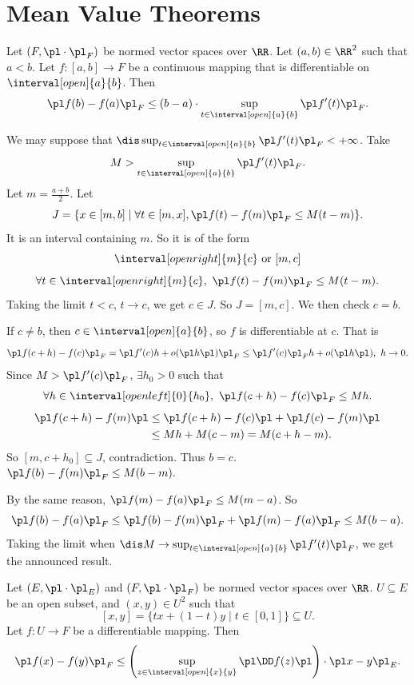 \section{Mean Value Theorems}
\begin{theoremenv}
    Let $(F,\pl\cdot\pl_F)$ be normed vector spaces over $\RR$. Let $(a,b)\in \RR^2$ such that $a<b$. Let $f:[a,b]\longrightarrow F$ be a continuous mapping that is differentiable on $\interval[open]{a}{b}$. Then 
    $$\pl f(b)-f(a)\pl_F\le  (b-a)\cdot \sup_{t\in \interval[open]{a}{b}}\pl f'(t)\pl_F.$$
    
\end{theoremenv}
\begin{proofenv}
    We may suppose that $\dis \sup_{t\in \interval[open]{a}{b}}\pl f'(t)\pl_F<+\infty$. Take
    $$M>\sup_{t\in \interval[open]{a}{b}}\pl f'(t)\pl_F.$$
    Let $m=\frac{a+b}{2}$. Let
    $$J=\{x\in[m,b]\mid \forall t\in [m,x], \pl f(t)-f(m)\pl_{F} \le M(t-m)\}.$$
    It is an interval containing $m$. So it is of the form 
    \[\interval[open right]{m}{c} \text{ or } [m,c]
    \]
    $$\forall t\in \interval[open right]{m}{c},\ \pl f(t)-f(m)\pl_{F}\le M(t-m).$$
    Taking the limit $t<c$, $t\rightarrow c$, we get $c\in J$. So $J=[m,c]$. We then check $c=b$.

    \quad If $c\neq b$, then $c\in \interval[open]{a}{b}$, so $f$ is differentiable at $c$. That is 
    $$\pl f(c+h)-f(c)\pl_{F}=\pl f'(c)h+o(\pl h \pl )\pl_{F}\le \pl f'(c)\pl_{F}h+o(\pl h\pl ),\ h\rightarrow 0.$$ 
    Since $M>\pl f'(c)\pl_F$, $\exists h_{0}>0$ such that 
    $$\forall h\in \interval[open left]{0}{h_0},\ \pl f(c+h)-f(c)\pl_{F}\le Mh.$$
    \begin{align*}
        \pl f(c+h)-f(m)\pl&\le \pl f(c+h)-f(c)\pl +\pl f(c)-f(m)\pl \\
        &\le M h +M(c-m)=M(c+h-m).
    \end{align*}
    So $[m,c+h_0]\subseteq J$, contradiction. Thus $b=c$. $\pl f(b)-f(m)\pl_F\le M(b-m).$

    \quad By the same reason, $\pl f(m)-f(a)\pl_F\le M(m-a)$. So
    $$\pl f(b)-f(a)\pl_F\le \pl f(b)-f(m)\pl_F+\pl f(m)-f(a)\pl_F\le  M(b-a).$$
    Taking the limit when $\dis M\rightarrow \sup_{t\in \interval[open]{a}{b}}\pl f'(t)\pl_F$, we get the announced result.
\end{proofenv}
\begin{corollaryenv}
    Let $(E,\pl \cdot\pl_{E})$ and $(F,\pl\cdot\pl_F)$ be normed vector spaces over $\RR$. $U\subseteq E$ be an open subset, and $(x,y)\in U^2$ such that 
    $$[x,y]=\{tx+(1-t)y\mid t\in [0,1]\}\subseteq U.$$
    Let $f:U\longrightarrow F$ be a differentiable mapping. Then
    $$\pl f(x)-f(y)\pl_F \le \left(\sup_{z\in \interval[open]{x}{y}}\pl \DD f(z)\pl\right)\cdot \pl x-y\pl_E .$$ 
\end{corollaryenv}
